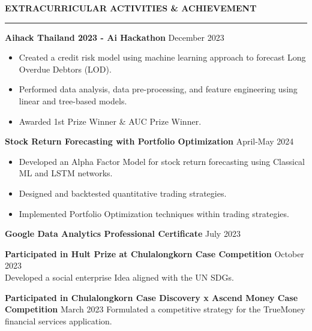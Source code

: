 \documentclass[11pt]{article}
\begin{document}
\vspace{12pt}
\textbf{EXTRACURRICULAR ACTIVITIES \& ACHIEVEMENT}
\vspace{5pt}
{\color{NavyBlue}\hrule}
\vspace{9pt}

\textbf{Aihack Thailand 2023 - Ai Hackathon} \hfill December 2023
\begin{itemize}[noitemsep, topsep=0pt, partopsep=0pt, parsep=0pt]
    \item Created a credit risk model using machine learning approach to forecast Long Overdue Debtors (LOD).
    \item Performed data analysis, data pre-processing, and feature engineering using linear and tree-based models.
    \item Awarded 1st Prize Winner \& AUC Prize Winner.
\end{itemize}

\vspace{6pt}

\textbf{Stock Return Forecasting with Portfolio Optimization} \hfill April-May 2024
\begin{itemize}[noitemsep, topsep=0pt, partopsep=0pt, parsep=0pt]
    \item Developed an Alpha Factor Model for stock return forecasting using Classical ML and LSTM networks.
    \item Designed and backtested quantitative trading strategies.
    \item Implemented Portfolio Optimization techniques within trading strategies.
\end{itemize}

\vspace{6pt}

\textbf{Google Data Analytics Professional Certificate} \hfill July 2023

\vspace{6pt}

\textbf{Participated in Hult Prize at Chulalongkorn Case Competition} \hfill October 2023\\
\hspace*{7pt} Developed a social enterprise Idea aligned with the UN SDGs.

\vspace{6pt}

\textbf{Participated in Chulalongkorn Case Discovery x Ascend Money Case Competition} \hfill March 2023
\hspace*{7pt} Formulated a competitive strategy for the TrueMoney financial services application.
\end{document}
